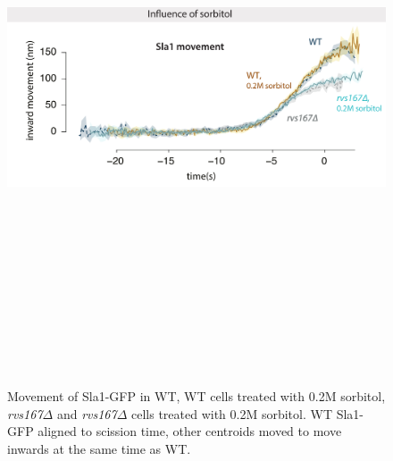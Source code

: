 	\begin{figure}[H]
	\centering
	\includegraphics[width=15cm,height=17cm,keepaspectratio]{figures/results_final/sorbitol2}
	\caption[Treatment of Rvs167del with Sorbitol]
	{Movement of Sla1-GFP in WT, WT cells treated with 0.2M sorbitol, \textit{rvs167$\Delta$} and \textit{rvs167$\Delta$} cells treated with 0.2M sorbitol. WT Sla1-GFP aligned to scission time, other centroids moved to move inwards at the same time as WT.}
	\end{figure}

